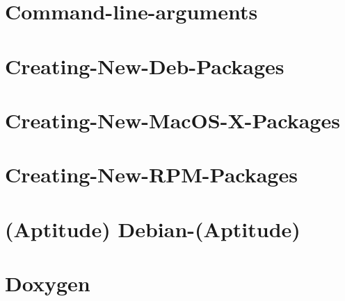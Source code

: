 \documentclass[twoside]{book}
\begin{document}
\chapter{Command-\/line-\/arguments}
\label{md__home_kodemonkey_workspace__t_s_g_l_docs-wiki__command-line-arguments}
\hypertarget{md__home_kodemonkey_workspace__t_s_g_l_docs-wiki__command-line-arguments}{}

\chapter{Creating-\/\-New-\/\-Deb-\/\-Packages}
\label{md__home_kodemonkey_workspace__t_s_g_l_docs-wiki__creating-_new-_deb-_packages}
\hypertarget{md__home_kodemonkey_workspace__t_s_g_l_docs-wiki__creating-_new-_deb-_packages}{}

\chapter{Creating-\/\-New-\/\-Mac\-O\-S-\/\-X-\/\-Packages}
\label{md__home_kodemonkey_workspace__t_s_g_l_docs-wiki__creating-_new-_mac_o_s-_x-_packages}
\hypertarget{md__home_kodemonkey_workspace__t_s_g_l_docs-wiki__creating-_new-_mac_o_s-_x-_packages}{}

\chapter{Creating-\/\-New-\/\-R\-P\-M-\/\-Packages}
\label{md__home_kodemonkey_workspace__t_s_g_l_docs-wiki__creating-_new-_r_p_m-_packages}
\hypertarget{md__home_kodemonkey_workspace__t_s_g_l_docs-wiki__creating-_new-_r_p_m-_packages}{}

\chapter{(Aptitude) Debian-\/(Aptitude)}
\label{md__home_kodemonkey_workspace__t_s_g_l_docs-wiki__debian-}
\hypertarget{md__home_kodemonkey_workspace__t_s_g_l_docs-wiki__debian-}{}

\chapter{Doxygen}
\label{md__home_kodemonkey_workspace__t_s_g_l_docs-wiki__doxygen}
\hypertarget{md__home_kodemonkey_workspace__t_s_g_l_docs-wiki__doxygen}{}

\end{document}

